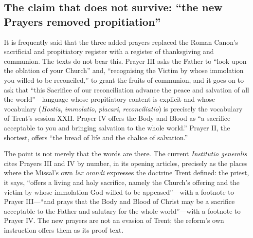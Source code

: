 \subsection{The claim that does not survive: ``the new Prayers removed propitiation''}

It is frequently said that the three added prayers replaced the Roman Canon's sacrificial and propitiatory register with a register of thanksgiving and communion. The texts do not bear this. Prayer III asks the Father to ``look upon the oblation of your Church'' and, ``recognising the Victim by whose immolation you willed to be reconciled,'' to grant the fruits of communion, and it goes on to ask that ``this Sacrifice of our reconciliation advance the peace and salvation of all the world''---language whose propitiatory content is explicit and whose vocabulary (\emph{Hostia}, \emph{immolatio}, \emph{placari}, \emph{reconciliatio}) is precisely the vocabulary of Trent's session XXII. Prayer IV offers the Body and Blood as ``a sacrifice acceptable to you and bringing salvation to the whole world.'' Prayer II, the shortest, offers ``the bread of life and the chalice of salvation.''

The point is not merely that the words are there. The current \emph{Institutio generalis} cites Prayers III and IV by number, in its opening articles, precisely as the places where the Missal's own \emph{lex orandi} expresses the doctrine Trent defined: the priest, it says, ``offers a living and holy sacrifice, namely the Church's offering and the victim by whose immolation God willed to be appeased''---with a footnote to Prayer III---``and prays that the Body and Blood of Christ may be a sacrifice acceptable to the Father and salutary for the whole world''---with a footnote to Prayer IV. The new prayers are not an evasion of Trent; the reform's own instruction offers them as its proof text.
